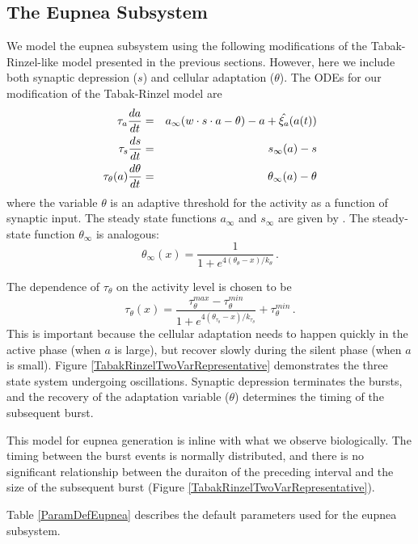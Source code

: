 \documentclass[12pt]{article}
\def\w{w}
\def\taus{\tau_s}
\def\ainf{a_\infty}
\def\sinf{s_\infty}
\def\thetainf{\theta_\infty}
\def\tautheta{\tau_\theta}
\def\tauthetamax{\tau_\theta^{max}}
\def\tauthetamin{\tau_\theta^{min}}
\def\thetatheta{\theta_\theta}
\def\ktheta{k_\theta}
\def\thetatautheta{\theta_{\tautheta}}
\def\ktautheta{k_{\tautheta}}
\def\xia{\xi_a}
\begin{document}
\clearpage
\subsection{The Eupnea Subsystem}

We model the eupnea subsystem using the following modifications of the Tabak-Rinzel-like model presented in the previous sections. However, 
here we include both synaptic depression ($s$) and 
cellular adaptation ($\theta$). 
The ODEs for our modification of the Tabak-Rinzel model are
\begin{eqnarray}
\tau_a \ddt{a} &=& \ainf (\w \cdot s \cdot a - \theta) - a + \hat{\xia}(a(t)) \label{ODEA} \\
\taus \ddt{s} &=& \sinf (a) - s  \label{ODES} \\
\tautheta(a) \ddt{\theta} &=& \thetainf (a) - \theta   \label{ODETHETA} 
\end{eqnarray}
where the variable  $\theta$ is an adaptive threshold for the activity as a function of synaptic input. 
The steady state functions $\ainf$ and $\sinf$ are given by .  The steady-state function $\thetainf$ is analogous:
\begin{equation}
\thetainf(x) = \frac{1}{1+e^{4(\thetatheta-x)/\ktheta}} \label{SQUASHTHETA} \, . 
\end{equation}

The dependence of $\tautheta$ on the activity level is chosen to be 
\begin{equation}
    \tautheta(x) = \frac{\tauthetamax - \tauthetamin}{1+e^{4(\thetatautheta-x)/\ktautheta}}  + \tauthetamin \, . 
\end{equation}
This is important because the cellular adaptation needs to happen quickly in the active phase (when $a$ is large), but recover slowly during the silent phase (when $a$ is small). Figure \ref{TabakRinzelTwoVarRepresentative} demonstrates the three state system undergoing oscillations. Synaptic depression terminates the bursts, and the recovery of the adaptation variable ($\theta$) determines the timing of the subsequent burst. 

This model for eupnea generation is inline with what we observe biologically. The timing between the burst events is normally distributed, and there is no significant relationship between the duraiton of the preceding interval and the size of the subsequent burst (Figure \ref{TabakRinzelTwoVarRepresentative}).

Table \ref{ParamDefEupnea} describes the default parameters used for the eupnea subsystem. 
\end{document}
